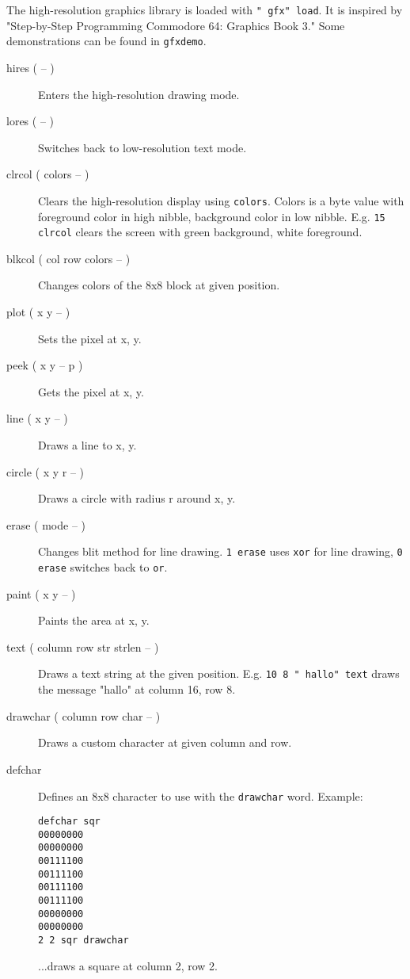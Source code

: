 The high-resolution graphics library is loaded with \texttt{" gfx" load}. 
It is inspired by "Step-by-Step Programming Commodore 64: Graphics Book 3."
Some demonstrations can be found in \texttt{gfxdemo}. 
\begin{description}
\item[hires ( -- )] Enters the high-resolution drawing mode.
\item[lores ( -- )] Switches back to low-resolution text mode.
\item[clrcol ( colors -- )] Clears the high-resolution display using \texttt{colors}. Colors is a
byte value with foreground color in high nibble, background color in low nibble. E.g. \texttt{15
clrcol} clears the screen with green background, white foreground.
\item[blkcol ( col row colors -- )] Changes colors of the 8x8 block at given position.
\item[plot ( x y -- )] Sets the pixel at x, y.
\item[peek ( x y -- p )] Gets the pixel at x, y.
\item[line ( x y -- )] Draws a line to x, y.
\item[circle ( x y r -- )] Draws a circle with radius r around x, y.
\item[erase ( mode -- )] Changes blit method for line drawing. \texttt{1 erase} uses \texttt{xor}
for line drawing, \texttt{0 erase} switches back to \texttt{or}.
\item[paint ( x y -- )] Paints the area at x, y.
\item[text ( column row str strlen -- )] Draws a text string at the given position. E.g. \texttt{10
8 " hallo" text} draws the message "hallo" at column 16, row 8.
\item[drawchar ( column row char -- )] Draws a custom character at given column and row.
\item[defchar] Defines an 8x8 character to use with the \texttt{drawchar} word. Example:

\begin{verbatim}
defchar sqr
00000000
00000000
00111100
00111100
00111100
00111100
00000000
00000000
2 2 sqr drawchar
\end{verbatim}

...draws a square at column 2, row 2.
\end{description}
